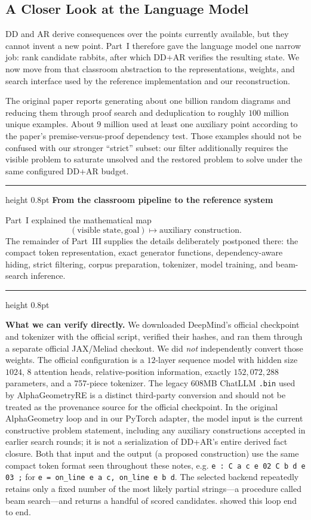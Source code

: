 \documentclass[reqno]{amsart}
\newenvironment{lecturebox}[1]{%
    \par\medskip
    \noindent\begingroup
    \setlength{\parindent}{0pt}
    \color{agblue}\hrule height 0.8pt\color{black}
    \smallskip
    \textbf{\color{agblue}#1}\par\smallskip
}{%
    \smallskip
    \color{agblue}\hrule height 0.8pt\color{black}
    \endgroup
    \medskip
}
\DeclareMathOperator{\1}{\textbf{1}}
\begin{document}
\subsection{A Closer Look at the Language Model}\label{sec: lm.py}

DD and AR derive consequences over the points currently available, but they
cannot invent a new point. Part~I therefore gave the language model one narrow
job: rank candidate rabbits, after which DD+AR verifies the resulting state.
We now move from that classroom abstraction to the representations, weights,
and search interface used by the reference implementation and our
reconstruction.

The original paper \cite{trinh2024solving} reports generating about one
billion random diagrams and reducing them through proof search and
deduplication to roughly \(100\) million unique examples. About \(9\) million
used at least one auxiliary point according to the paper's
premise-versus-proof dependency test. Those examples should not be confused
with our stronger ``strict'' subset: our filter additionally requires the
visible problem to saturate unsolved and the restored problem to solve under
the same configured DD+AR budget.

\begin{lecturebox}{From the classroom pipeline to the reference system}
Part~I explained the mathematical map
\[
(\text{visible state},\text{goal})
\longmapsto
\text{auxiliary construction}.
\]
The remainder of Part~III supplies the details deliberately postponed there:
the compact token representation, exact generator functions,
dependency-aware hiding, strict filtering, corpus preparation, tokenizer,
model training, and beam-search inference.
\end{lecturebox}

\textbf{What we can verify directly.} We downloaded DeepMind's official
checkpoint and tokenizer with the official script, verified their hashes, and
ran them through a separate official JAX/Meliad checkout. We did \emph{not}
independently convert those weights. The official configuration is a
$12$-layer sequence model with hidden size $1024$, $8$ attention heads,
relative-position information, exactly $152{,}072{,}288$ parameters, and a
757-piece tokenizer. The legacy 608MB ChatLLM \verb|.bin| used by
AlphaGeometryRE is a distinct third-party conversion and should not be treated
as the provenance source for the official checkpoint.  In the original
AlphaGeometry loop and in our PyTorch adapter, the model input is the current
constructive problem statement, including any auxiliary constructions accepted
in earlier search rounds; it is not a serialization of DD+AR's entire derived
fact closure.  Both that input and the output (a proposed construction) use
the same compact token format seen throughout these notes,
e.g. \verb|e : C a c e 02 C b d e 03 ;| for
\verb|e = on_line e a c, on_line e b d|. The selected backend repeatedly
retains only a fixed number of the most likely partial strings---a procedure
called beam search---and returns a handful of scored candidates.
 showed this loop end to
end.
\end{document}
